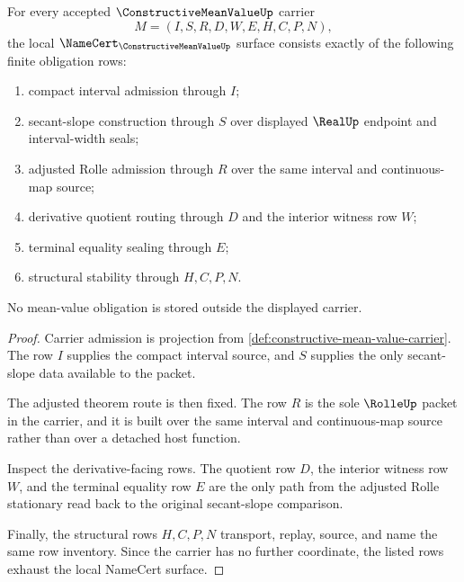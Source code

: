 \begin{theorem}
\label{thm:constructive-mean-value-namecert-obligations}
For every accepted $\ConstructiveMeanValueUp$ carrier
$$
M=(I,S,R,D,W,E,H,C,P,N),
$$
the local $\NameCert_{\ConstructiveMeanValueUp}$ surface consists exactly of the following finite obligation rows:
\begin{enumerate}
\item compact interval admission through $I$;
\item secant-slope construction through $S$ over displayed $\RealUp$ endpoint and interval-width seals;
\item adjusted Rolle admission through $R$ over the same interval and continuous-map source;
\item derivative quotient routing through $D$ and the interior witness row $W$;
\item terminal equality sealing through $E$;
\item structural stability through $H,C,P,N$.
\end{enumerate}
No mean-value obligation is stored outside the displayed carrier.
\end{theorem}
\begin{proof}
Carrier admission is projection from \autoref{def:constructive-mean-value-carrier}. The row $I$ supplies the compact interval source, and $S$ supplies the only secant-slope data available to the packet.

The adjusted theorem route is then fixed. The row $R$ is the sole $\RolleUp$ packet in the carrier, and it is built over the same interval and continuous-map source rather than over a detached host function.

Inspect the derivative-facing rows. The quotient row $D$, the interior witness row $W$, and the terminal equality row $E$ are the only path from the adjusted Rolle stationary read back to the original secant-slope comparison.

Finally, the structural rows $H,C,P,N$ transport, replay, source, and name the same row inventory. Since the carrier has no further coordinate, the listed rows exhaust the local NameCert surface.
\end{proof}

